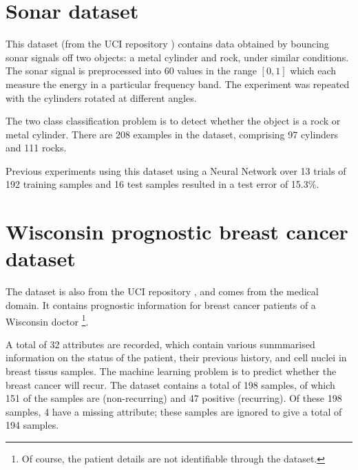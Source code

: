 \section{Sonar dataset}

This dataset (from the UCI repository \cite{UCI}) contains data
obtained by bouncing sonar signals off two objects: a metal cylinder
and rock, under similar conditions.  The sonar signal is preprocessed
into 60 values in the range $[0,1]$ which each measure the energy in a
particular frequency band.  The experiment was repeated with the
cylinders rotated at different angles.

The two class classification problem is to detect whether the object
is a rock or metal cylinder.  There are 208 examples in the dataset,
comprising 97 cylinders and 111 rocks.

Previous experiments using this dataset \cite{Gorman88} using a Neural
Network over 13 trials of 192 training samples and 16 test samples
resulted in a test error of 15.3\%.


\section{Wisconsin prognostic breast cancer dataset}

The  dataset is also from the UCI repository \cite{UCI}, and
comes from the medical domain.  It contains prognostic information for
breast cancer patients of a Wisconsin doctor%
\footnote{Of course, the patient details are not identifiable through
the dataset.}.

A total of 32 attributes are recorded, which contain various
sunmmarised information on the status of the patient, their previous
history, and cell nuclei in breast tissus samples.  The machine
learning problem is to predict whether the breast cancer will recur.
The dataset contains a total of 198 samples, of which 151 of the
samples are (non-recurring) and 47 positive (recurring).  Of these 198
samples, 4 have a missing attribute; these samples are ignored to give
a total of 194 samples.
